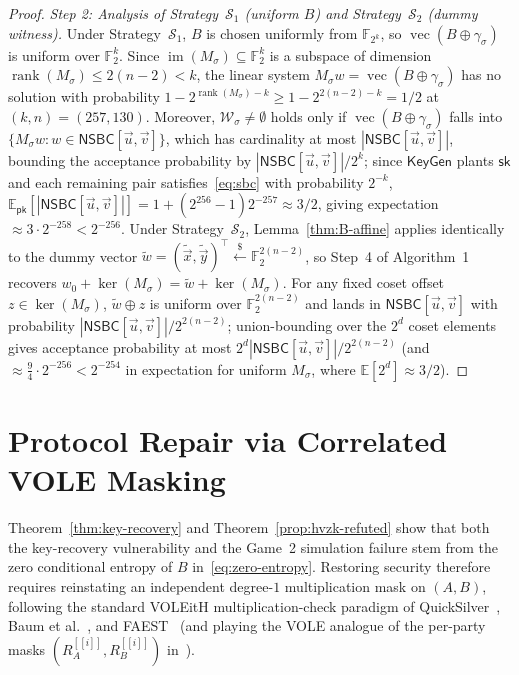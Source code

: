 \documentclass[11pt,a4paper]{article}
\theoremstyle{definition}
\theoremstyle{remark}
\newcommand{\Ftwo}{\mathbb{F}_2}
\newcommand{\Ftwok}{\mathbb{F}_{2^k}}
\newcommand{\NSBC}{\mathsf{NSBC}}
\newcommand{\pk}{\mathsf{pk}}
\newcommand{\sk}{\mathsf{sk}}
\newcommand{\rank}{\operatorname{rank}}
\newcommand{\vecF}{\operatorname{vec}}
\newcommand{\share}[1]{[\![#1]\!]}
\begin{document}
\begin{proof}
\smallskip\noindent
\emph{Step 2: Analysis of Strategy~$\mathcal{S}_1$ (uniform $B$) and Strategy~$\mathcal{S}_2$ (dummy witness).}
Under Strategy~$\mathcal{S}_1$, $B$ is chosen uniformly from $\Ftwok$, so $\vecF(B \oplus \gamma_\sigma)$ is uniform over $\Ftwo^k$. Since $\operatorname{im}(M_\sigma) \subseteq \Ftwo^k$ is a subspace of dimension $\rank(M_\sigma) \le 2(n-2) < k$, the linear system $M_\sigma w = \vecF(B \oplus \gamma_\sigma)$ has no solution with probability $1 - 2^{\rank(M_\sigma) - k} \ge 1 - 2^{2(n-2)-k} = 1/2$ at $(k, n) = (257, 130)$. Moreover, $\mathcal{W}_\sigma \neq \emptyset$ holds only if $\vecF(B \oplus \gamma_\sigma)$ falls into $\{M_\sigma w : w \in \NSBC[\vec{u}, \vec{v}]\}$, which has cardinality at most $|\NSBC[\vec{u}, \vec{v}]|$, bounding the acceptance probability by $|\NSBC[\vec{u}, \vec{v}]| / 2^k$; since $\mathsf{KeyGen}$ plants $\sk$ and each remaining pair satisfies~\eqref{eq:sbc} with probability $2^{-k}$, $\mathbb{E}_{\pk}[|\NSBC[\vec{u}, \vec{v}]|] = 1 + (2^{256}-1)2^{-257} \approx 3/2$, giving expectation $\approx 3 \cdot 2^{-258} < 2^{-256}$. Under Strategy~$\mathcal{S}_2$, Lemma~\ref{thm:B-affine} applies identically to the dummy vector $\tilde{w} = (\tilde{\vec{x}}, \tilde{\vec{y}})^\top \xleftarrow{\$} \Ftwo^{2(n-2)}$, so Step~4 of Algorithm~1 recovers $w_0 + \ker(M_\sigma) = \tilde{w} + \ker(M_\sigma)$. For any fixed coset offset $z \in \ker(M_\sigma)$, $\tilde{w} \oplus z$ is uniform over $\Ftwo^{2(n-2)}$ and lands in $\NSBC[\vec{u}, \vec{v}]$ with probability $|\NSBC[\vec{u}, \vec{v}]| / 2^{2(n-2)}$; union-bounding over the $2^d$ coset elements gives acceptance probability at most $2^d |\NSBC[\vec{u}, \vec{v}]| / 2^{2(n-2)}$ (and $\approx \frac{9}{4} \cdot 2^{-256} < 2^{-254}$ in expectation for uniform $M_\sigma$, where $\mathbb{E}[2^d] \approx 3/2$).
\end{proof}

\section{Protocol Repair via Correlated VOLE Masking}
\label{sec:repair}

Theorem~\ref{thm:key-recovery} and Theorem~\ref{prop:hvzk-refuted} show that both the key-recovery vulnerability and the Game~2 simulation failure stem from the zero conditional entropy of $B$ in~\eqref{eq:zero-entropy}. Restoring security therefore requires reinstating an independent degree-$1$ multiplication mask on $(A, B)$, following the standard VOLEitH multiplication-check paradigm of QuickSilver~\cite{YSWW21}, Baum et al.~\cite{BBDKORS23}, and FAEST~\cite{FAEST24} (and playing the VOLE analogue of the per-party masks $(R_A^{\share{i}}, R_B^{\share{i}})$ in~\cite{HJ24}).
\end{document}
